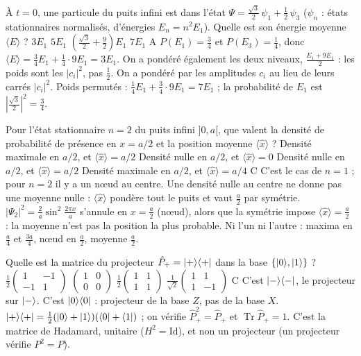   {À $t=0$, une particule du puits infini est dans l'état $\Psi=\frac{\sqrt3}{2}\,\psi_1+\frac12\,\psi_3$ ($\psi_n$ : états stationnaires normalisés, d'énergies $E_n=n^2E_1$). Quelle est son énergie moyenne $\langle E\rangle$ ?}
  {$3E_1$}
  {$5E_1$}
  {$\left(\frac{\sqrt3}{2}+\frac92\right)E_1$}
  {$7E_1$}
  {A}
\qcmx
  {$P(E_1)=\frac34$ et $P(E_3)=\frac14$, donc $\langle E\rangle=\frac34E_1+\frac14\cdot9E_1=3E_1$.}
  {On a pondéré également les deux niveaux, $\frac{E_1+9E_1}{2}$ : les poids sont les $|c_i|^2$, pas $\frac12$.}
  {On a pondéré par les amplitudes $c_i$ au lieu de leurs carrés $|c_i|^2$.}
  {Poids permutés : $\frac14E_1+\frac34\cdot9E_1=7E_1$ ; la probabilité de $E_1$ est $\left|\frac{\sqrt3}{2}\right|^2=\frac34$.}

  {Pour l'état stationnaire $n=2$ du puits infini $]0,a[$, que valent la densité de probabilité de présence en $x=a/2$ et la position moyenne $\langle\hat x\rangle$ ?}
  {Densité maximale en $a/2$, et $\langle\hat x\rangle=a/2$}
  {Densité nulle en $a/2$, et $\langle\hat x\rangle=0$}
  {Densité nulle en $a/2$, et $\langle\hat x\rangle=a/2$}
  {Densité maximale en $a/2$, et $\langle\hat x\rangle=a/4$}
  {C}
\qcmx
  {C'est le cas de $n=1$ ; pour $n=2$ il y a un nœud au centre.}
  {Une densité nulle au centre ne donne pas une moyenne nulle : $\langle\hat x\rangle$ pondère tout le puits et vaut $\frac a2$ par symétrie.}
  {$|\Psi_2|^2=\frac2a\sin^2\frac{2\pi x}{a}$ s'annule en $x=\frac a2$ (nœud), alors que la symétrie impose $\langle\hat x\rangle=\frac a2$ : la moyenne n'est pas la position la plus probable.}
  {Ni l'un ni l'autre : maxima en $\frac a4$ et $\frac{3a}4$, nœud en $\frac a2$, moyenne $\frac a2$.}

  {Quelle est la matrice du projecteur $\hat P_+=|+\rangle\langle +|$ dans la base $\{|0\rangle,|1\rangle\}$ ?}
  {$\frac12\begin{pmatrix}1&-1\\-1&1\end{pmatrix}$}
  {$\begin{pmatrix}1&0\\0&0\end{pmatrix}$}
  {$\frac12\begin{pmatrix}1&1\\1&1\end{pmatrix}$}
  {$\frac{1}{\sqrt2}\begin{pmatrix}1&1\\1&-1\end{pmatrix}$}
  {C}
\qcmx
  {C'est $|-\rangle\langle -|$, le projecteur sur $|-\rangle$.}
  {C'est $|0\rangle\langle 0|$ : projecteur de la base $Z$, pas de la base $X$.}
  {$|+\rangle\langle +|=\frac12(|0\rangle+|1\rangle)(\langle 0|+\langle 1|)$ ; on vérifie $\hat P_+^2=\hat P_+$ et $\operatorname{Tr}\hat P_+=1$.}
  {C'est la matrice de Hadamard, unitaire ($H^2=\mathrm{Id}$), et non un projecteur (un projecteur vérifie $P^2=P$).}

